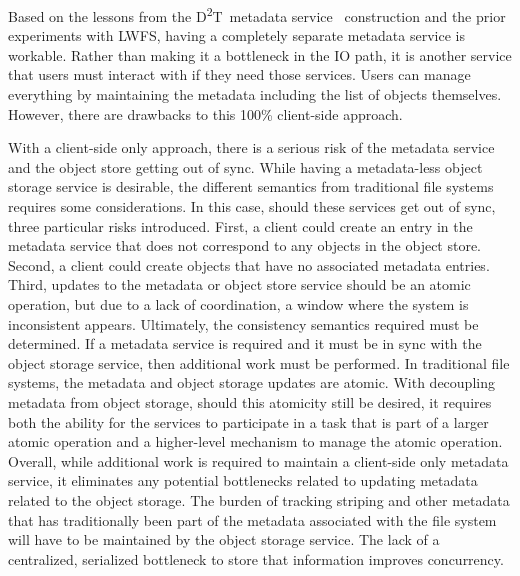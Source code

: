 \documentclass[conference]{IEEEtran}
\newcommand{\DDT}{D\textsuperscript{2}T~}
\begin{document}
Based on the lessons from the \DDT metadata
service~\cite{lofstead:2012:txn-metadata} construction and the prior
experiments with LWFS, having a completely separate metadata service is
workable. Rather than making it a bottleneck in the IO path, it is another
service that users must interact with if they need those services.  Users can
manage everything by maintaining the metadata including the list of objects
themselves. However, there are drawbacks to this 100\% client-side approach.

With a client-side only approach, there is a serious risk of the metadata
service and the object store getting out of sync.  While having a metadata-less
object storage service is desirable, the different semantics from traditional
file systems requires some considerations. In this case, should these services
get out of sync, three particular risks introduced.  First, a client could
create an entry in the metadata service that does not correspond to any objects
in the object store. Second, a client could create objects that have no
associated metadata entries. Third, updates to the metadata or object store
service should be an atomic operation, but due to a lack of coordination, a
window where the system is inconsistent appears.  Ultimately, the consistency
semantics required must be determined. If a metadata service is required and it
must be in sync with the object storage service, then additional work must be
performed. In traditional file systems, the metadata and object storage updates
are atomic. With decoupling metadata from object storage, should this atomicity
still be desired, it requires both the ability for the services to participate
in a task that is part of a larger atomic operation and a higher-level
mechanism to manage the atomic operation. Overall, while additional work is
required to maintain a client-side only metadata service, it eliminates any
potential bottlenecks related to updating metadata related to the object
storage. The burden of tracking striping and other metadata that has
traditionally been part of the metadata associated with the file system will
have to be maintained by the object storage service. The lack of a centralized,
serialized bottleneck to store that information improves concurrency.
\end{document}
